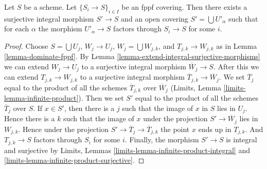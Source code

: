 \begin{lemma}
\label{lemma-dominate-fppf-integral}
Let $S$ be a scheme. Let $\{S_i \to S\}_{i \in I}$ be an fppf covering.
Then there exists a surjective integral morphism $S' \to S$ and an
open covering $S' = \bigcup U'_\alpha$ such that for each $\alpha$ the
morphism $U'_\alpha \to S$ factors through $S_i \to S$ for some $i$.
\end{lemma}

\begin{proof}
Choose $S = \bigcup U_j$, $W_j \to U_j$, $W_j = \bigcup W_{j, k}$, and
$T_{j, k} \to W_{j, k}$ as in Lemma \ref{lemma-dominate-fppf}.
By Lemma \ref{lemma-extend-integral-surjective-morphisms}
we can extend $W_j \to U_j$ to a surjective integral
morphism $\overline{W}_j \to S$.
After this we can extend $T_{j, k} \to W_{j, k}$ to a surjective
integral morphism $\overline{T}_{j, k} \to \overline{W}_j$.
We set $\overline{T}_j$ equal to the product of all the schemes
$\overline{T}_{j, k}$ over $\overline{W}_j$
(Limits, Lemma \ref{limits-lemma-infinite-product}).
Then we set $S'$ equal to the product of all the schemes
$\overline{T}_j$ over $S$.
If $x \in S'$, then there is a $j$ such that the image of $x$ in
$S$ lies in $U_j$. Hence there is a $k$ such that the image of
$x$ under the projection $S' \to \overline{W}_j$ lies in $W_{j, k}$.
Hence under the projection $S' \to \overline{T}_j \to \overline{T}_{j, k}$
the point $x$ ends up in $T_{j, k}$. And $T_{j, k} \to S$
factors through $S_i$ for some $i$.
Finally, the morphism $S' \to S$ is integral and surjective
by Limits, Lemmas \ref{limits-lemma-infinite-product-integral} and
\ref{limits-lemma-infinite-product-surjective}.
\end{proof}
